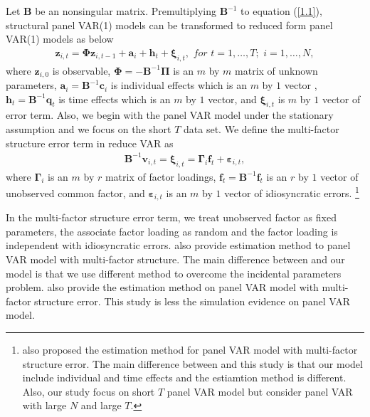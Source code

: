 \documentclass[12pt,a4paper,hyperref]{article}
\begin{document}
Let $\boldsymbol{B}$ be an nonsingular matrix. Premultiplying $\boldsymbol{B}^{-1}$ to equation (\ref{1.1}),  structural panel VAR(1) models can be transformed to  reduced form panel VAR(1) models as below
\begin{align}
\boldsymbol{z}_{i,t}=\boldsymbol{\Phi} \boldsymbol{z}_{i,t-1}+\boldsymbol{a}_{i}+\boldsymbol{h}_{t}+ \boldsymbol{\xi}_{i,t}, \,\, for \,\, t=1,\ldots, T;\,\,i=1,\ldots,N, \label{1}
\end{align}
where $\boldsymbol{z}_{i,0}$ is observable, $\boldsymbol{\Phi}=-\boldsymbol{B}^{-1}\boldsymbol{\Pi}$ is an $m$ by $m$ matrix of unknown parameters, $\boldsymbol{a}_{i}=\boldsymbol{B}^{-1}\boldsymbol{c}_{i}$ is individual effects which is an $m$ by $1$ vector , $\boldsymbol{h}_{t}=\boldsymbol{B}^{-1}\boldsymbol{q}_{t}$ is time effects  which is an $m$ by $1$ vector, and $\boldsymbol{\xi}_{i,t}$ is $m$ by $1$ vector of error term.  Also, we begin with  the panel VAR model under the stationary assumption  and we focus on the short $T$ data set.
We define the multi-factor structure error term in reduce VAR as
\begin{align}
\boldsymbol{B}^{-1}\boldsymbol{v}_{i,t}=\boldsymbol{\xi}_{i,t}=\boldsymbol{\Gamma}_{i}\boldsymbol{f}_{t}+\boldsymbol{\varepsilon}_{i,t}, \label{2}
\end{align}
where  $\boldsymbol{\Gamma}_{i}$ is an $m$ by $r$ matrix of factor loadings, $\boldsymbol{f}_{t}=\boldsymbol{B}^{-1}\boldsymbol{f}_{t}$ is an $r$ by $1$ vector of unobserved common factor, and $\boldsymbol{\varepsilon}_{i,t}$ is an $m$ by $1$ vector of idiosyncratic errors. \footnote{ \citet{Huang:2008} also proposed  the estimation method for panel VAR model with multi-factor structure error. The main difference between \citet{Huang:2008} and this study is that our model include individual and time effects and the estiamtion method is different. Also, our study focus on short $T$ panel VAR model but \citet{Huang:2008} consider panel VAR with large $N$ and large $T$.}



In the multi-factor structure error term, we treat unobserved factor as fixed parameters, the associate factor loading as random and the factor loading is independent with idiosyncratic errors.
 \citet{Bai:2013} also provide estimation method to panel VAR model with multi-factor structure. The main difference between  \citet{Bai:2013} and our model is that we use different method to overcome the incidental parameters problem. \citet{Moon:2017} also provide the estimation method on panel VAR model with multi-factor structure error. This study is less the simulation evidence on panel VAR model.
\end{document}
